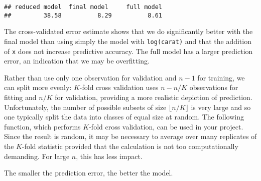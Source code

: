 \documentclass[]{book}
\theoremstyle{definition}
\theoremstyle{definition}
\theoremstyle{definition}
\theoremstyle{remark}
\begin{document}
\begin{verbatim}
## reduced model  final model     full model 
##         38.58          8.29          8.61
\end{verbatim}

The cross-validated error estimate shows that we do significantly better
with the final model than using simply the model with
\texttt{log(carat)} and that the addition of \texttt{x} does not
increase predictive accuracy. The full model has a larger prediction
error, an indication that we may be overfitting.

Rather than use only one observation for validation and \(n-1\) for
training, we can split more evenly: \(K\)-fold cross validation uses
\(n-n/K\) observations for fitting and \(n/K\) for validation, providing
a more realistic depiction of prediction. Unfortunately, the number of
possible subsets of size \(\lfloor n/K\rfloor\) is very large and so one
typically split the data into classes of equal size at random. The
following function, which performs \(K\)-fold cross validation, can be
used in your project. Since the result is random, it may be necessary to
average over many replicates of the \(K\)-fold statistic provided that
the calculation is not too computationally demanding. For large \(n\),
this has less impact.

The smaller the prediction error, the better the model.
\end{document}
